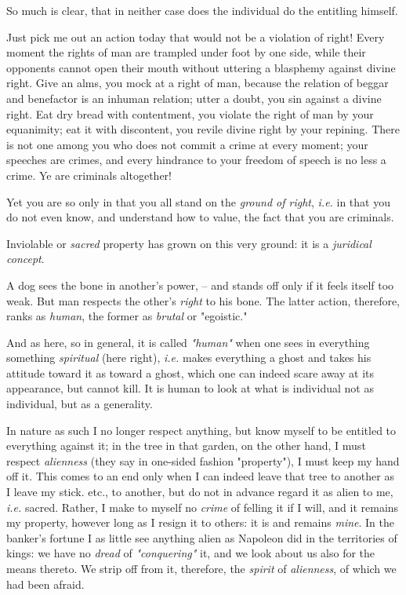 \documentclass[a4paper]{book}
\begin{document}
So much is clear, that in neither case does the individual do the entitling 
himself.

Just pick me out an action today that would not be a violation of right! Every 
moment the rights of man are trampled under foot by one side, while their 
opponents cannot open their mouth without uttering a blasphemy against divine 
right. Give an alms, you mock at a right of man, because the relation of 
beggar and benefactor is an inhuman relation; utter a doubt, you sin against a 
divine right. Eat dry bread with contentment, you violate the right of man by 
your equanimity; eat it with discontent, you revile divine right by your 
repining. There is not one among you who does not commit a crime at every 
moment; your speeches are crimes, and every hindrance to your freedom of 
speech is no less a crime. Ye are criminals altogether!

Yet you are so only in that you all stand on the \textit{ground of right}, 
\textit{i.e.} in that you do not even know, and understand how to value, the 
fact that you are criminals.

Inviolable or \textit{sacred} property has grown on this very ground: it is a 
\textit{juridical concept}.

A dog sees the bone in another's power, -- and stands off only if it feels 
itself too weak. But man respects the other's \textit{right} to his bone. The 
latter action, therefore, ranks as \textit{human}, the former as 
\textit{brutal} or "{}egoistic."{}

And as here, so in general, it is called \textit{"{}human"{}} when one sees in 
everything something \textit{spiritual} (here right), \textit{i.e.} makes 
everything a ghost and takes his attitude toward it as toward a ghost, which 
one can indeed scare away at its appearance, but cannot kill. It is human to 
look at what is individual not as individual, but as a generality.

In nature as such I no longer respect anything, but know myself to be entitled 
to everything against it; in the tree in that garden, on the other hand, I 
must respect \textit{alienness} (they say in one-sided fashion 
"{}property"{}), I must keep my hand off it. This comes to an end only when I 
can indeed leave that tree to another as I leave my stick. etc., to another, 
but do not in advance regard it as alien to me, \textit{i.e.} sacred. Rather, 
I make to myself no \textit{crime} of felling it if I will, and it remains my 
property, however long as I resign it to others: it is and remains 
\textit{mine}. In the banker's fortune I as little see anything alien as 
Napoleon did in the territories of kings: we have no \textit{dread} of 
\textit{"{}conquering"{}} it, and we look about us also for the means thereto. 
We strip off from it, therefore, the \textit{spirit} of \textit{alienness}, of 
which we had been afraid.
\end{document}
